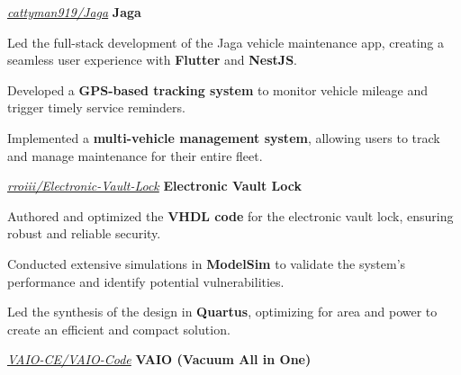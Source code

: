 \documentclass[../main.tex]{subfiles}
\begin{document}
\vspace{0.2 cm}

\begin{twocolentry}{
    \small
    \textit{\href{https://github.com/cattyman919/Jaga}{cattyman919/Jaga}}
}
    \textbf{Jaga}
\end{twocolentry}

\vspace{0.10 cm}
\begin{onecolentry}
\begin{highlights}
    \item Led the full-stack development of the Jaga vehicle maintenance app, creating a seamless user experience with \textbf{Flutter} and \textbf{NestJS}.
    \item Developed a \textbf{GPS-based tracking system} to monitor vehicle mileage and trigger timely service reminders.
    \item Implemented a \textbf{multi-vehicle management system}, allowing users to track and manage maintenance for their entire fleet.
\end{highlights}
\end{onecolentry}

\vspace{0.2 cm}

\begin{twocolentry}{
    \small
    \textit{\href{https://github.com/rroiii/Electronic-Vault-Lock}{rroiii/Electronic-Vault-Lock}}
}
    \textbf{Electronic Vault Lock}
\end{twocolentry}

\vspace{0.10 cm}
\begin{onecolentry}
\begin{highlights}
    \item Authored and optimized the \textbf{VHDL code} for the electronic vault lock, ensuring robust and reliable security.
    \item Conducted extensive simulations in \textbf{ModelSim} to validate the system's performance and identify potential vulnerabilities.
    \item Led the synthesis of the design in \textbf{Quartus}, optimizing for area and power to create an efficient and compact solution.
\end{highlights}
\end{onecolentry}

\vspace{0.2 cm}

\begin{twocolentry}{
    \small
    \textit{\href{https://github.com/VAIO-CE/VAIO-Code}{VAIO-CE/VAIO-Code}}
}
    \textbf{VAIO (Vacuum All in One)}
\end{twocolentry}
\end{document}
